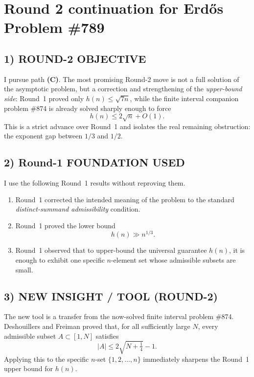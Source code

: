 \section{Round 2 continuation for Erd\H{o}s Problem \#789}

\subsection*{1) ROUND-2 OBJECTIVE}

I pursue path \textbf{(C)}. The most promising Round-2 move is not a full solution of the asymptotic problem, but a correction and strengthening of the \emph{upper-bound side}: Round~1 proved only \(h(n)\le \sqrt{7n}\), while the finite interval companion problem \#874 is already solved sharply enough to force
\[
h(n)\le 2\sqrt n + O(1).
\]
This is a strict advance over Round~1 and isolates the real remaining obstruction: the exponent gap between \(1/3\) and \(1/2\).

\subsection*{2) Round-1 FOUNDATION USED}

I use the following Round~1 results without reproving them.

\begin{enumerate}
\item Round~1 corrected the intended meaning of the problem to the standard \emph{distinct-summand admissibility} condition.
\item Round~1 proved the lower bound
\[
h(n)\gg n^{1/3}.
\]
\item Round~1 observed that to upper-bound the universal guarantee \(h(n)\), it is enough to exhibit one specific \(n\)-element set whose admissible subsets are small.
\end{enumerate}

\subsection*{3) NEW INSIGHT / TOOL (ROUND-2)}

The new tool is a transfer from the now-solved finite interval problem \#874. Deshouillers and Freiman proved that, for all sufficiently large \(N\), every admissible subset \(A\subset [1,N]\) satisfies
\[
|A|\le 2\sqrt{N+\tfrac14}-1.
\]
Applying this to the specific \(n\)-set \(\{1,2,\dots,n\}\) immediately sharpens the Round~1 upper bound for \(h(n)\).


